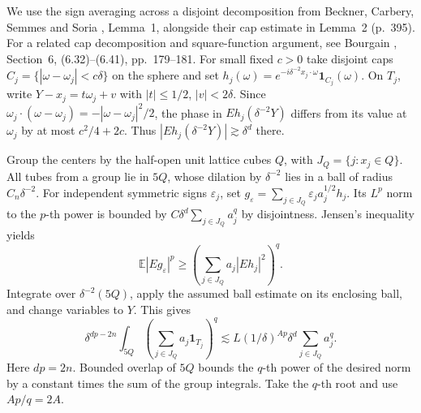We use the sign averaging across a disjoint decomposition from Beckner, Carbery, Semmes and Soria \cite{r-7}, Lemma~1, alongside their cap estimate in Lemma~2 (p.~395). For a related cap decomposition and square-function argument, see Bourgain \cite{r-13}, Section~6, (6.32)--(6.41), pp.~179--181. For small fixed \(c>0\) take disjoint caps \(C_j=\{|\omega-\omega_j|<c\delta\}\) on the sphere and set \(h_j(\omega)=e^{-i\delta^{-2}x_j\cdot\omega}\mathbf1_{C_j}(\omega)\). On \(T_j\), write \(Y-x_j=t\omega_j+v\) with \(|t|\le1/2\), \(|v|<2\delta\). Since \(\omega_j\cdot(\omega-\omega_j)=-|\omega-\omega_j|^2/2\), the phase in \(Eh_j(\delta^{-2}Y)\) differs from its value at \(\omega_j\) by at most \(c^2/4+2c\). Thus \(|Eh_j(\delta^{-2}Y)|\gtrsim\delta^d\) there.

Group the centers by the half-open unit lattice cubes \(Q\), with \(J_Q=\{j:x_j\in Q\}\). All tubes from a group lie in \(5Q\), whose dilation by \(\delta^{-2}\) lies in a ball of radius \(C_n\delta^{-2}\). For independent symmetric signs \(\varepsilon_j\), set \(g_\varepsilon=\sum_{j\in J_Q}\varepsilon_j a_j^{1/2}h_j\). Its \(L^p\) norm to the \(p\)-th power is bounded by \(C\delta^d\sum_{j\in J_Q}a_j^q\) by disjointness. Jensen's inequality yields
\[
 \mathbb E|Eg_\varepsilon|^p\ge
 \left(\sum_{j\in J_Q}a_j|Eh_j|^2\right)^q .
\]
Integrate over \(\delta^{-2}(5Q)\), apply the assumed ball estimate on its enclosing ball, and change variables to \(Y\). This gives
\[
 \delta^{dp-2n}\int_{5Q}\left(\sum_{j\in J_Q}a_j\mathbf1_{T_j}\right)^q
 \lesssim L(1/\delta)^{Ap}\delta^d\sum_{j\in J_Q}a_j^q .
\]
Here \(dp=2n\). Bounded overlap of \(5Q\) bounds the \(q\)-th power of the desired norm by a constant times the sum of the group integrals. Take the \(q\)-th root and use \(Ap/q=2A\).
